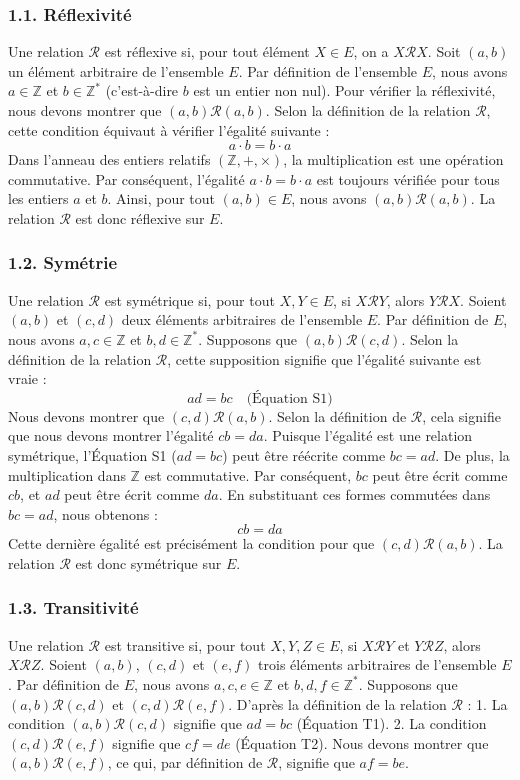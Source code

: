 \documentclass{report}
\begin{document}
\subsubsection*{1.1. Réflexivité}
Une relation $\mathcal{R}$ est réflexive si, pour tout élément $X \in E$, on a $X \mathcal{R} X$.
Soit $(a,b)$ un élément arbitraire de l'ensemble $E$.
Par définition de l'ensemble $E$, nous avons $a \in \mathbb{Z}$ et $b \in \mathbb{Z}^*$ (c'est-à-dire $b$ est un entier non nul).
Pour vérifier la réflexivité, nous devons montrer que $(a,b) \mathcal{R} (a,b)$.
Selon la définition de la relation $\mathcal{R}$, cette condition équivaut à vérifier l'égalité suivante :
$$ a \cdot b = b \cdot a $$
Dans l'anneau des entiers relatifs $(\mathbb{Z}, +, \times)$, la multiplication est une opération commutative.
Par conséquent, l'égalité $a \cdot b = b \cdot a$ est toujours vérifiée pour tous les entiers $a$ et $b$.
Ainsi, pour tout $(a,b) \in E$, nous avons $(a,b) \mathcal{R} (a,b)$.
La relation $\mathcal{R}$ est donc réflexive sur $E$.

\subsubsection*{1.2. Symétrie}
Une relation $\mathcal{R}$ est symétrique si, pour tout $X, Y \in E$, si $X \mathcal{R} Y$, alors $Y \mathcal{R} X$.
Soient $(a,b)$ et $(c,d)$ deux éléments arbitraires de l'ensemble $E$.
Par définition de $E$, nous avons $a, c \in \mathbb{Z}$ et $b, d \in \mathbb{Z}^*$.
Supposons que $(a,b) \mathcal{R} (c,d)$.
Selon la définition de la relation $\mathcal{R}$, cette supposition signifie que l'égalité suivante est vraie :
$$ ad = bc \quad \text{(Équation S1)} $$
Nous devons montrer que $(c,d) \mathcal{R} (a,b)$.
Selon la définition de $\mathcal{R}$, cela signifie que nous devons montrer l'égalité $cb = da$.
Puisque l'égalité est une relation symétrique, l'Équation S1 ($ad = bc$) peut être réécrite comme $bc = ad$.
De plus, la multiplication dans $\mathbb{Z}$ est commutative.
Par conséquent, $bc$ peut être écrit comme $cb$, et $ad$ peut être écrit comme $da$.
En substituant ces formes commutées dans $bc = ad$, nous obtenons :
$$ cb = da $$
Cette dernière égalité est précisément la condition pour que $(c,d) \mathcal{R} (a,b)$.
La relation $\mathcal{R}$ est donc symétrique sur $E$.

\subsubsection*{1.3. Transitivité}
Une relation $\mathcal{R}$ est transitive si, pour tout $X, Y, Z \in E$, si $X \mathcal{R} Y$ et $Y \mathcal{R} Z$, alors $X \mathcal{R} Z$.
Soient $(a,b)$, $(c,d)$ et $(e,f)$ trois éléments arbitraires de l'ensemble $E$.
Par définition de $E$, nous avons $a, c, e \in \mathbb{Z}$ et $b, d, f \in \mathbb{Z}^*$.
Supposons que $(a,b) \mathcal{R} (c,d)$ et $(c,d) \mathcal{R} (e,f)$.
D'après la définition de la relation $\mathcal{R}$ :
1.  La condition $(a,b) \mathcal{R} (c,d)$ signifie que $ad = bc$ (Équation T1).
2.  La condition $(c,d) \mathcal{R} (e,f)$ signifie que $cf = de$ (Équation T2).
Nous devons montrer que $(a,b) \mathcal{R} (e,f)$, ce qui, par définition de $\mathcal{R}$, signifie que $af = be$.
\end{document}
